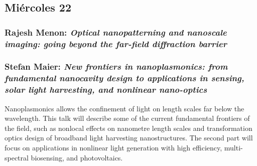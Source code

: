 % 
% 
% 
% 
% 
% 
    
\subsection*{Mi\'ercoles 22}

\subsubsection*{Rajesh Menon: \textit{Optical nanopatterning and nanoscale
imaging: going beyond the far-field diffraction barrier}}

\subsubsection*{Stefan Maier: \textit{New frontiers in nanoplasmonics: from
fundamental nanocavity design to applications in sensing, solar light
harvesting, and nonlinear nano-optics}}

Nanoplasmonics allows the confinement of light on length scales far below the
wavelength. This talk will describe some of the current fundamental frontiers of
the field, such as nonlocal effects on nanometre length scales and
transformation optics design of broadband light harvesting nanostructures. The
second part will focus on applications in nonlinear light generation with high
efficiency, multi-spectral biosensing, and photovoltaics.


